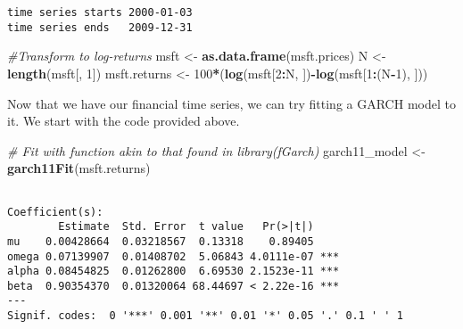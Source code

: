 \documentclass[]{book}
\newenvironment{Shaded}{\begin{snugshade}}{\end{snugshade}}
\newcommand{\KeywordTok}[1]{\textcolor[rgb]{0.13,0.29,0.53}{\textbf{#1}}}
\newcommand{\DecValTok}[1]{\textcolor[rgb]{0.00,0.00,0.81}{#1}}
\newcommand{\StringTok}[1]{\textcolor[rgb]{0.31,0.60,0.02}{#1}}
\newcommand{\CommentTok}[1]{\textcolor[rgb]{0.56,0.35,0.01}{\textit{#1}}}
\newcommand{\OperatorTok}[1]{\textcolor[rgb]{0.81,0.36,0.00}{\textbf{#1}}}
\newcommand{\NormalTok}[1]{#1}
\begin{document}
\begin{verbatim}
time series starts 2000-01-03
time series ends   2009-12-31
\end{verbatim}

\begin{Shaded}
\begin{Highlighting}[]
\CommentTok{#Transform to log-returns}
\NormalTok{msft <-}\StringTok{ }\KeywordTok{as.data.frame}\NormalTok{(msft.prices)}
\NormalTok{N <-}\StringTok{ }\KeywordTok{length}\NormalTok{(msft[, }\DecValTok{1}\NormalTok{])}
\NormalTok{msft.returns <-}\StringTok{ }\DecValTok{100}\OperatorTok{*}\NormalTok{(}\KeywordTok{log}\NormalTok{(msft[}\DecValTok{2}\OperatorTok{:}\NormalTok{N, ])}\OperatorTok{-}\KeywordTok{log}\NormalTok{(msft[}\DecValTok{1}\OperatorTok{:}\NormalTok{(N}\OperatorTok{-}\DecValTok{1}\NormalTok{), ]))}
\end{Highlighting}
\end{Shaded}

Now that we have our financial time series, we can try fitting a GARCH
model to it. We start with the code provided above.

\begin{Shaded}
\begin{Highlighting}[]
\CommentTok{# Fit with function akin to that found in library(fGarch)}
\NormalTok{garch11_model <-}\StringTok{ }\KeywordTok{garch11Fit}\NormalTok{(msft.returns)}
\end{Highlighting}
\end{Shaded}

\begin{verbatim}

Coefficient(s):
        Estimate  Std. Error  t value   Pr(>|t|)    
mu    0.00428664  0.03218567  0.13318    0.89405    
omega 0.07139907  0.01408702  5.06843 4.0111e-07 ***
alpha 0.08454825  0.01262800  6.69530 2.1523e-11 ***
beta  0.90354370  0.01320064 68.44697 < 2.22e-16 ***
---
Signif. codes:  0 '***' 0.001 '**' 0.01 '*' 0.05 '.' 0.1 ' ' 1
\end{verbatim}
\end{document}
